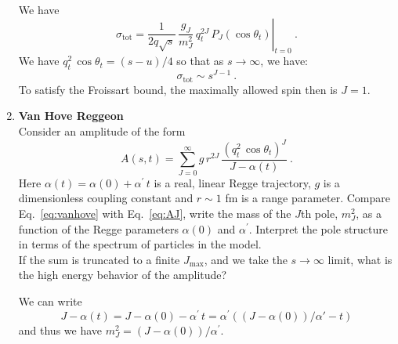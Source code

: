 \begin{enumerate}
          \begin{solution}
              We have
              \begin{equation}
                  \sigma_\text{tot} = \left. \frac{1}{2q\sqrt{s}} \, \frac{g_J}{m_J^2} \, q_t^{2J} \, P_J(\cos\theta_t)  \right |_{t=0} ~.
              \end{equation}
              We have $q_t^2 \, \cos\theta_t = (s-u)/ 4$ so that as $s\to \infty$, we have:
              \begin{equation}
                  \sigma_\text{tot} \sim s^{J-1} ~.
              \end{equation}
              To satisfy the Froissart bound, the maximally allowed spin then is $J=1$.
          \end{solution}

    \item \textbf{Van Hove Reggeon} \\
          Consider an amplitude of the form
          \begin{equation}
              \label{eq:vanhove}
              A(s,t) = \sum_{J=0}^\infty g \, r^{2J} \, \frac{ (q_t^2 \, \cos\theta_t)^J}{J- \alpha(t)} ~.
          \end{equation}
          Here $\alpha(t) = \alpha(0) + \alpha^\prime \, t$ is a real, linear Regge trajectory, $g$ is a dimensionless coupling constant and $r \sim 1$ fm is a range parameter.
          Compare Eq.~\ref{eq:vanhove} with Eq.~\ref{eq:AJ}, write the mass of the $J$th pole, $m_J^2$, as a function of the Regge parameters $\alpha(0)$ and $\alpha^\prime$. Interpret the pole structure in terms of the spectrum of particles in the model.
          \\

          \noindent If the sum is truncated to a finite $J_\text{max}$, and we take the $s\to \infty$ limit, what is the high energy behavior of the amplitude?

          \begin{solution}
              We can write
              \begin{equation}
                  J-\alpha(t) = J - \alpha(0) - \alpha^\prime \, t = \alpha^\prime \left( (J-\alpha(0))/\alpha' - t\right)
              \end{equation}
              and thus we have $m_J^2 = (J-\alpha(0))/\alpha^\prime$.


\end{solution}
\end{enumerate}
